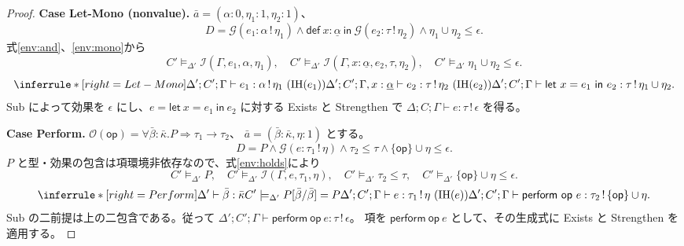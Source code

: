\documentclass[a4paper,11pt]{article}
\theoremstyle{definition}
\newenvironment{Case}[1]{\par\smallskip\noindent\textbf{Case #1.}\enspace\ignorespaces}{\par}
\newcommand{\op}{\mathsf{op}}
\newcommand{\ops}{\mathcal O}
\newcommand{\jj}[6]{#1;#2;#3\vdash #4:#5\,!\,#6}
\newcommand{\J}[3]{\jj{\Delta}{C}{\Gamma}{#1}{#2}{#3}}
\newcommand{\Def}[3]{\mathsf{def}\ #1:#2\ \mathsf{in}\ #3}
\newcommand{\lete}[3]{\mathsf{let}\ #1=#2\ \mathsf{in}\ #3}
\newcommand{\perform}[2]{\mathsf{perform}\ #1\ #2}
\newcommand{\mono}[1]{\underline{#1}}
\begin{document}
\begin{proof}
\begin{Case}{Let-Mono (nonvalue)}
$\bar a=(\alpha:0,\eta_1:1,\eta_2:1)$、
\[
 D=\mathcal G(e_1:\alpha\,!\,\eta_1)
 \land\Def x{\mono\alpha}{\mathcal G(e_2:\tau\,!\,\eta_2)}
 \land\eta_1\cup\eta_2\leq\epsilon.
\]
式\eqref{env:and}、\eqref{env:mono}から
\[
 C'\models_{\Delta'}\mathcal I(\Gamma,e_1,\alpha,\eta_1),\quad
 C'\models_{\Delta'}\mathcal I(\Gamma,x:\mono\alpha,e_2,\tau,\eta_2),\quad
 C'\models_{\Delta'}\eta_1\cup\eta_2\leq\epsilon.
\]
\[
 \inferrule*[right=Let-Mono]{
 \jj{\Delta'}{C'}\Gamma{e_1}\alpha{\eta_1}\ (\mathrm{IH}(e_1))\\
 \jj{\Delta'}{C'}{\Gamma,x:\mono\alpha}{e_2}\tau{\eta_2}\ (\mathrm{IH}(e_2))}
 {\jj{\Delta'}{C'}\Gamma{\lete x{e_1}{e_2}}\tau{\eta_1\cup\eta_2}}.
\]
Sub によって効果を $\epsilon$ にし、$e=\lete x{e_1}{e_2}$ に対する
Exists と Strengthen で $\J e\tau\epsilon$ を得る。
\end{Case}

\begin{Case}{Perform}
$\ops(\op)=\forall\bar\beta:\bar\kappa.P\Rightarrow\tau_1\to\tau_2$、
$\bar a=(\bar\beta:\bar\kappa,\eta:1)$ とする。
\[
 D=P\land\mathcal G(e:\tau_1\,!\,\eta)
 \land\tau_2\leq\tau\land\{\op\}\cup\eta\leq\epsilon.
\]
$P$ と型・効果の包含は項環境非依存なので、式\eqref{env:holds}により
\[
 C'\models_{\Delta'}P,\quad
 C'\models_{\Delta'}\mathcal I(\Gamma,e,\tau_1,\eta),\quad
 C'\models_{\Delta'}\tau_2\leq\tau,\quad
 C'\models_{\Delta'}\{\op\}\cup\eta\leq\epsilon.
\]
\[
 \inferrule*[right=Perform]{\Delta'\vdash\bar\beta:\bar\kappa\\
 C'\models_{\Delta'}P[\bar\beta/\bar\beta]=P\\
 \jj{\Delta'}{C'}\Gamma e{\tau_1}\eta\ (\mathrm{IH}(e))}
 {\jj{\Delta'}{C'}\Gamma{\perform\op e}{\tau_2}{\{\op\}\cup\eta}}.
\]
Sub の二前提は上の二包含である。従って
$\jj{\Delta'}{C'}\Gamma{\perform\op e}\tau\epsilon$。
項を $\perform\op e$ として、その生成式に Exists と Strengthen を適用する。
\end{Case}


\end{proof}
\end{document}
